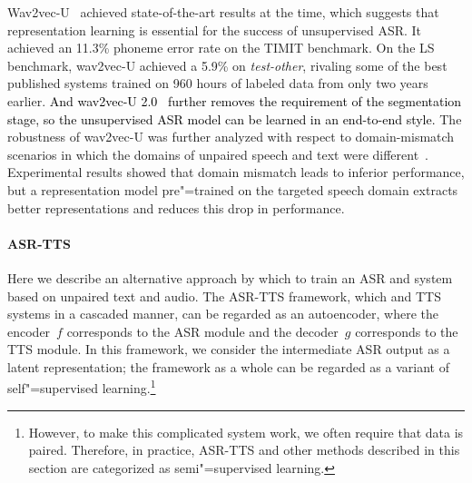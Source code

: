 Wav2vec-U~\parencite{baevski_unsupervised_2021} achieved state-of-the-art results at the time, which suggests that representation learning is
essential for the success of unsupervised ASR.
It achieved an 11.3\% phoneme error rate on the TIMIT benchmark. 
On the LS benchmark, wav2vec-U achieved a 5.9\%  on
\emph{test-other}, rivaling some of the best published systems trained on 960 hours of labeled data from only two years earlier. 
\textcolor{black}{
And wav2vec-U 2.0~\parencite{liu_endtoend_2023} further removes the requirement of the segmentation stage, so the unsupervised ASR model can be learned in an end-to-end style.}
The robustness of wav2vec-U was further analyzed with respect to 
domain-mismatch scenarios in which the domains of unpaired
speech and text were different~\parencite{lin_analyzing_2022}.
Experimental results showed that domain mismatch leads to inferior performance, but a representation model pre"=trained on the targeted speech domain extracts better representations and reduces this drop in performance.



\paragraph{ASR-TTS}
Here we describe an alternative approach by which to train an ASR and  system
based on unpaired text and audio. The ASR-TTS framework, which  and
TTS systems in a cascaded manner,
can be regarded as an autoencoder, where the encoder~$f$
corresponds to the ASR module and the decoder~$g$ corresponds to the TTS module.
In this framework, we consider the intermediate ASR output as a latent
representation; the framework as a whole can be regarded as a variant of
self"=supervised learning.\footnote{However, to make this complicated
system work, we often require that data is paired. Therefore, in practice,
ASR-TTS and other methods described in this section are categorized as
semi"=supervised learning.}

